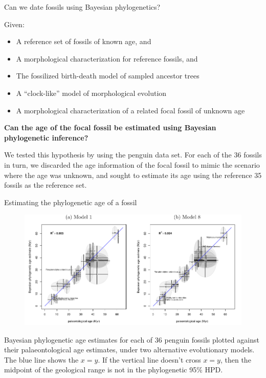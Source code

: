 \begin{frame}{Can we date fossils using Bayesian phylogenetics? }

Given:
\begin{itemize}
\item A reference set of fossils of known age, and
\item A morphological characterization for reference fossils, and
\item The fossilized birth-death model of sampled ancestor trees
\item A ``clock-like'' model of morphological evolution 
\item A morphological characterization of a related focal fossil of unknown age 
\end{itemize}

{\bf Can the age of the focal fossil be estimated using Bayesian phylogenetic inference?}

\medskip{}

We tested this hypothesis by using the penguin data set. For each of the 36 fossils in turn, we discarded the age information of the focal fossil to mimic the scenario where the age was unknown, and sought to estimate its age using the reference 35 fossils as the reference set. 

\end{frame}


\begin{frame}{Estimating the phylogenetic age of a fossil}
\begin{figure}
\includegraphics[width=\textwidth]{../Figure1.pdf}
\end{figure}
Bayesian phylogenetic age estimates for each of 36 penguin fossils plotted against their palaeontological age estimates, under two alternative evolutionary models. 
The blue line shows the $x=y$. If the vertical line doesn't cross $x=y$, then the midpoint of the geological range is not in the phylogenetic 95\% HPD. 
\end{frame}

